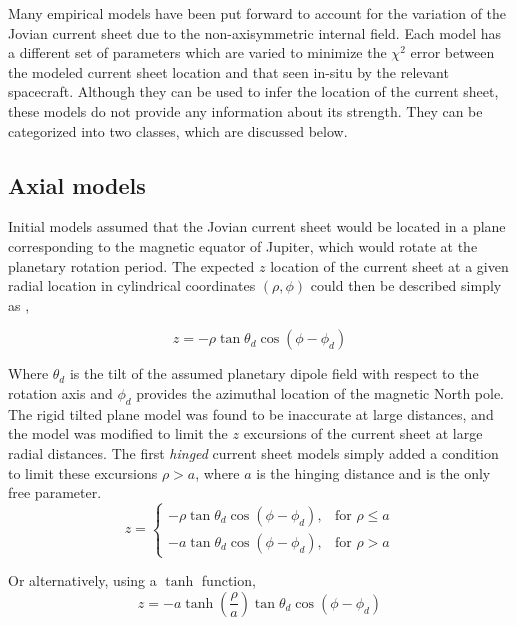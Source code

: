 Many empirical models have been put forward to account for the variation of the Jovian current sheet due to the non-axisymmetric internal field. Each model has a different set of parameters which are varied to minimize the $\chi^2$ error between the modeled current sheet location and that seen in-situ by the relevant spacecraft. Although they can be used to infer the location of the current sheet, these models do not provide any information about its strength. They can be categorized into two classes, which are discussed below. 

\subsection{Axial models}
Initial models assumed that the Jovian current sheet would be located in a plane corresponding to the magnetic equator of Jupiter, which would rotate at the planetary rotation period. The expected $z$ location of the current sheet at a given radial location in cylindrical coordinates $(\rho, \phi)$ could then be described simply as \cite{VanAllen1974EnergeticJupiter,Goertz1976TheMagnetosphere},

\begin{equation}
    z = -\rho \tan\theta_d \cos\left(\phi - \phi_d\right)
\end{equation}

Where $\theta_d$ is the tilt of the assumed planetary dipole field with respect to the rotation axis and $\phi_d$ provides the azimuthal location of the magnetic North pole. The rigid tilted plane model was found to be inaccurate at large distances, and the model was modified to limit the $z$ excursions of the current sheet at large radial distances. The first \emph{hinged} current sheet models \cite{Smith1974The10,Hill1974ConfigurationMagnetosphere} simply added a condition to limit these excursions $\rho > a$, where $a$ is the hinging distance and is the only free parameter.
\begin{equation}
    z = \begin{cases}
    -\rho \tan\theta_d \cos\left(\phi - \phi_d\right), & \text{for } \rho \leq a\\
    -a \tan\theta_d \cos\left(\phi - \phi_d\right), & \text{for } \rho > a
    \end{cases}
\end{equation}

Or alternatively, using a $\tanh$ function, 
\begin{equation}
    z = -a \tanh\left(\frac{\rho}{a}\right) \tan\theta_d \cos\left(\phi - \phi_d\right)
\end{equation}

